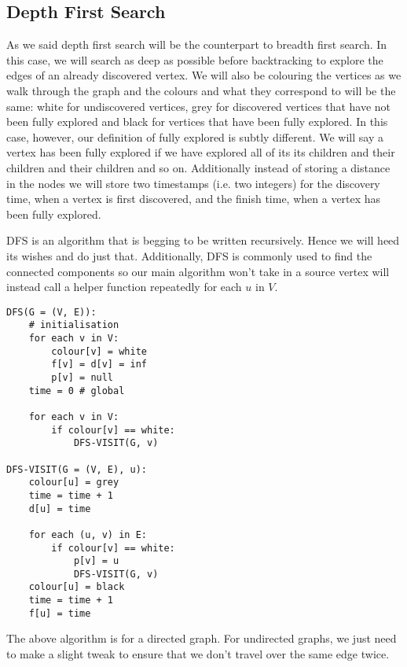 \subsection{Depth First Search}
As we said depth first search will be the counterpart to breadth first search. In this case, we will search as deep as possible before backtracking to explore the edges of an already discovered vertex. We will also be colouring the vertices as we walk through the graph and the colours and what they correspond to will be the same: white for undiscovered vertices, grey for discovered vertices that have not been fully explored and black for vertices that have been fully explored. In this case, however, our definition of fully explored is subtly different. We will say a vertex has been fully explored if we have explored all of its its children and their children and their children and so on. Additionally instead of storing a distance in the nodes we will store two timestamps (i.e. two integers) for the discovery time, when a vertex is first discovered, and the finish time, when a vertex has been fully explored.

DFS is an algorithm that is begging to be written recursively. Hence we will heed its wishes and do just that. Additionally, DFS is commonly used to find the connected components so our main algorithm won't take in a source vertex will instead call a helper function  repeatedly for each $u$ in $V$. 

\begin{lstlisting}
DFS(G = (V, E)):
    # initialisation
    for each v in V:
        colour[v] = white
        f[v] = d[v] = inf
        p[v] = null
    time = 0 # global
    
    for each v in V:
        if colour[v] == white:
            DFS-VISIT(G, v)

DFS-VISIT(G = (V, E), u):
    colour[u] = grey
    time = time + 1
    d[u] = time
    
    for each (u, v) in E:
        if colour[v] == white:
            p[v] = u
            DFS-VISIT(G, v)
    colour[u] = black
    time = time + 1
    f[u] = time
\end{lstlisting}
\begin{remark}
The above algorithm is for a directed graph. For undirected graphs, we just need to make a slight tweak to ensure that we don't travel over the same edge twice.
\end{remark}

